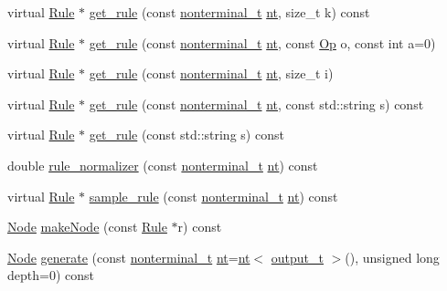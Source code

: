 \begin{DoxyCompactItemize}
\item 
virtual \hyperlink{class_rule}{Rule} $\ast$ \hyperlink{class_grammar_ad340d2b8ee3b22ff8b697f917a50c0a5}{get\+\_\+rule} (const \hyperlink{_nonterminal_8h_a1c5bfe9b903f69c83bbde5da7035fef3}{nonterminal\+\_\+t} \hyperlink{class_grammar_ac7ec043aec5203a2cfac44f9cec50132}{nt}, size\+\_\+t k) const
\item 
virtual \hyperlink{class_rule}{Rule} $\ast$ \hyperlink{class_grammar_a92123503b80e2c10f0d9b766baf6304f}{get\+\_\+rule} (const \hyperlink{_nonterminal_8h_a1c5bfe9b903f69c83bbde5da7035fef3}{nonterminal\+\_\+t} \hyperlink{class_grammar_ac7ec043aec5203a2cfac44f9cec50132}{nt}, const \hyperlink{_ops_8h_a588e6b56097e045c733b60d25c4d45ab}{Op} o, const int a=0)
\item 
virtual \hyperlink{class_rule}{Rule} $\ast$ \hyperlink{class_grammar_ab2186c76238d843d6ba4242348f0a458}{get\+\_\+rule} (const \hyperlink{_nonterminal_8h_a1c5bfe9b903f69c83bbde5da7035fef3}{nonterminal\+\_\+t} \hyperlink{class_grammar_ac7ec043aec5203a2cfac44f9cec50132}{nt}, size\+\_\+t i)
\item 
virtual \hyperlink{class_rule}{Rule} $\ast$ \hyperlink{class_grammar_ac952ea1ee2eb218622d3db8fa1a5e00f}{get\+\_\+rule} (const \hyperlink{_nonterminal_8h_a1c5bfe9b903f69c83bbde5da7035fef3}{nonterminal\+\_\+t} \hyperlink{class_grammar_ac7ec043aec5203a2cfac44f9cec50132}{nt}, const std\+::string s) const
\item 
virtual \hyperlink{class_rule}{Rule} $\ast$ \hyperlink{class_grammar_a742a677c65f8d14394f5370e8800686d}{get\+\_\+rule} (const std\+::string s) const
\item 
double \hyperlink{class_grammar_a52be4a9de3a90db8034ede12c344e241}{rule\+\_\+normalizer} (const \hyperlink{_nonterminal_8h_a1c5bfe9b903f69c83bbde5da7035fef3}{nonterminal\+\_\+t} \hyperlink{class_grammar_ac7ec043aec5203a2cfac44f9cec50132}{nt}) const
\item 
virtual \hyperlink{class_rule}{Rule} $\ast$ \hyperlink{class_grammar_a427f722a7cc03e06d2ae9321a8b5b757}{sample\+\_\+rule} (const \hyperlink{_nonterminal_8h_a1c5bfe9b903f69c83bbde5da7035fef3}{nonterminal\+\_\+t} \hyperlink{class_grammar_ac7ec043aec5203a2cfac44f9cec50132}{nt}) const
\item 
\hyperlink{class_node}{Node} \hyperlink{class_grammar_aec960301035c8f5f1f8e62338bb3f860}{make\+Node} (const \hyperlink{class_rule}{Rule} $\ast$r) const
\item 
\hyperlink{class_node}{Node} \hyperlink{class_grammar_a63735fcfa3049ea5daef9dc5f5cb8a3e}{generate} (const \hyperlink{_nonterminal_8h_a1c5bfe9b903f69c83bbde5da7035fef3}{nonterminal\+\_\+t} \hyperlink{class_grammar_ac7ec043aec5203a2cfac44f9cec50132}{nt}=\hyperlink{class_grammar_ac7ec043aec5203a2cfac44f9cec50132}{nt}$<$ \hyperlink{class_grammar_aee7630d758322022048d06605b07e697}{output\+\_\+t} $>$(), unsigned long depth=0) const

\end{DoxyCompactItemize}
